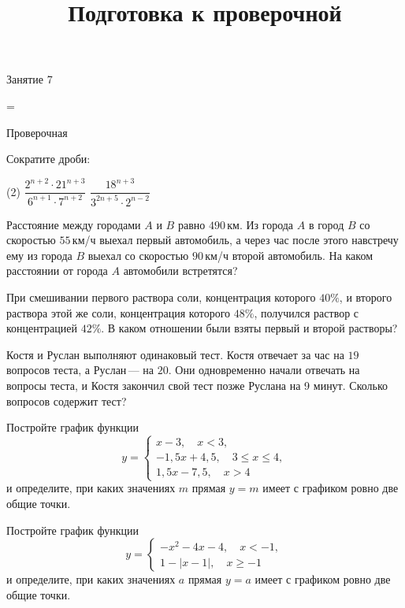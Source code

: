 \begin{class}[number=7]
	\title{Подготовка к проверочной}
	\begin{listofex}
		\item Занятие 7
	\end{listofex}
\end{class}

=%
\begin{exam}
	\begin{listofex}
		\item Проверочная
	\end{listofex}
\end{exam}

\begin{consultation}
	\begin{listofex}
		\item Сократите дроби:
		\begin{tasks}(2)
			\task \( \dfrac{2^{n+2}\cdot21^{n+3}}{6^{n+1}\cdot7^{n+2}} \)
			\task \( \dfrac{18^{n+3}}{3^{2n+5}\cdot2^{n-2}} \)
		\end{tasks}
		\item Расстояние между городами \( A \) и \( B \) равно \( 490 \) км. Из города \( A \) в город \( B \) со скоростью \( 55 \) км/ч выехал первый автомобиль, а через час после этого навстречу ему из города \( B \) выехал со скоростью \( 90 \) км/ч второй автомобиль. На каком расстоянии от города \( A \) автомобили встретятся?
		\item При смешивании первого раствора соли, концентрация которого \( 40\% \), и второго раствора этой же соли, концентрация которого \( 48\% \), получился раствор с концентрацией \( 42\% \). В каком отношении были взяты первый и второй растворы?
		\item Костя и Руслан выполняют одинаковый тест. Костя отвечает за час на \( 19 \) вопросов теста, а Руслан --- на \( 20 \). Они одновременно начали отвечать на вопросы теста, и Костя закончил свой тест позже Руслана на 9 минут. Сколько вопросов содержит тест?
		\item Постройте график функции
		\[y=	 \left\{
		\begin{array}{l}
			x-3, \quad x<3,\\
			-1,5x+4,5, \quad 3\le x\le4,\\
			1,5x-7,5, \quad x>4
		\end{array}
		\right. \]
		и определите, при каких значениях \( m \) прямая \( y=m \) имеет с графиком ровно две общие точки.
		\item  Постройте график функции
		\[y=	 \left\{
		\begin{array}{l}
			-x^2-4x-4, \quad x<-1,\\
			1-|x-1|, \quad x\ge-1
		\end{array}
		\right. \]
		и определите, при каких значениях \( a \) прямая \( y=a \) имеет с графиком ровно две общие точки.
	\end{listofex}
\end{consultation}

